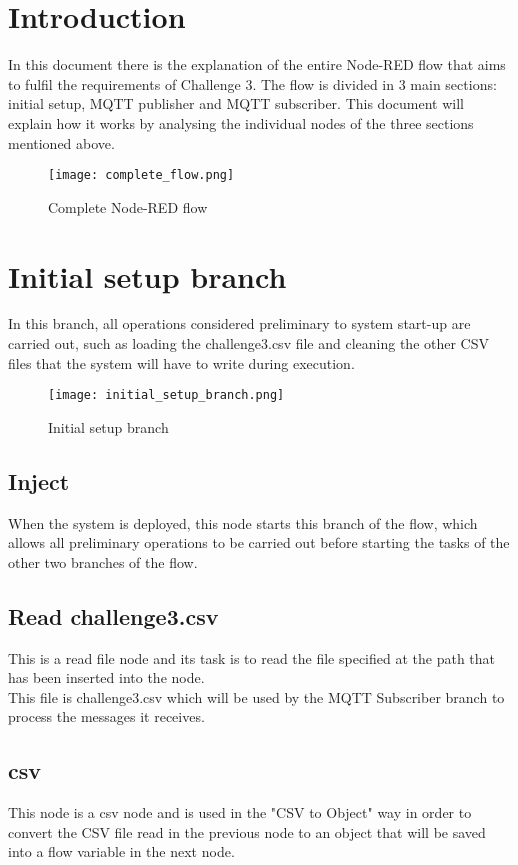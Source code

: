 \section{Introduction}
In this document there is the explanation of the entire Node-RED flow that aims to fulfil the requirements of Challenge 3.
The flow is divided in 3 main sections: initial setup, MQTT publisher and MQTT subscriber.
This document will explain how it works by analysing the individual nodes of the three sections mentioned above.

\begin{figure}[H]
    \centering
    \texttt{[image: complete\_flow.png]}
    \caption{Complete Node-RED flow}
\end{figure}

\section{Initial setup branch}
In this branch, all operations considered preliminary to system start-up are carried out, such as loading the challenge3.csv file and cleaning the other CSV files that the system will have to write during execution.
\label{sec:initial_setup_branch}
\begin{figure}[H]
    \centering
    \texttt{[image: initial\_setup\_branch.png]}
    \caption{Initial setup branch}
\end{figure}
\subsection{Inject}
When the system is deployed, this node starts this branch of the flow, which allows all preliminary operations to be carried out before starting the tasks of the other two branches of the flow.

\subsection{Read challenge3.csv }
This is a read file node and its task is to read the file specified at the path that has been inserted into the node.\\
This file is challenge3.csv which will be used by the MQTT Subscriber branch to process the messages it receives.

\subsection{csv}
This node is a csv node and is used in the "CSV to Object" way in order to convert the CSV file read in the previous node to an object that will be saved into a flow variable in the next node.

